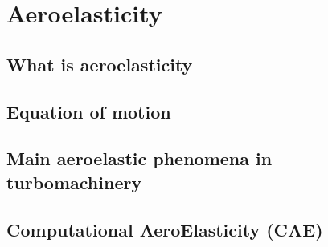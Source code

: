 \chapter{Aeroelasticity}
\label{cha:ael}

\chabstract{}

\minitoc
\newpage

\section{What is aeroelasticity}
\label{sec:what_is_ael}


\section{Equation of motion}
\label{sec:equation_of_motion}


\section{Main aeroelastic phenomena in turbomachinery}
\label{sec:ael_phenomena}


\section{Computational AeroElasticity (CAE)}
\label{sec:ael_cae}


\chconclu{}
